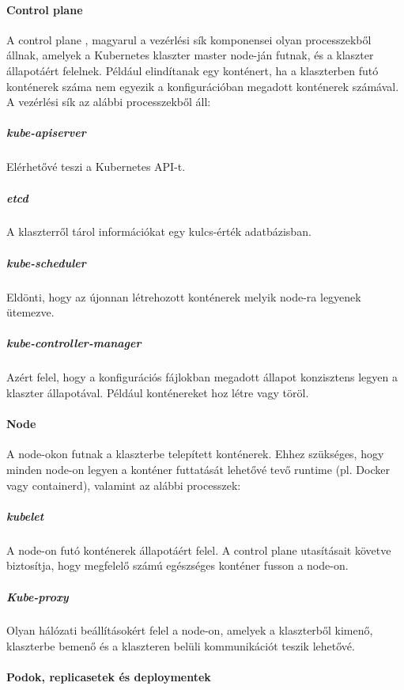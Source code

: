 \documentclass[a4paper,oneside]{article}
\begin{document}
\paragraph{Control plane}

A control plane \cite{kubernetes-cp-and-node}, magyarul a vezérlési sík
komponensei olyan processzekből állnak, amelyek a Kubernetes klaszter master
node-ján futnak, és a klaszter állapotáért felelnek. Például elindítanak egy
konténert, ha a klaszterben futó konténerek száma nem egyezik a konfigurációban
megadott konténerek számával. A vezérlési sík az alábbi processzekből áll:

\subparagraph{kube-apiserver}

Elérhetővé teszi a Kubernetes API-t.

\subparagraph{etcd}

A klaszterről tárol információkat egy kulcs-érték adatbázisban.

\subparagraph{kube-scheduler}

Eldönti, hogy az újonnan létrehozott konténerek melyik node-ra legyenek ütemezve.

\subparagraph{kube-controller-manager}

Azért felel, hogy a konfigurációs fájlokban megadott állapot konzisztens legyen
a klaszter állapotával. Például konténereket hoz létre vagy töröl.

\paragraph{Node}

A node-okon \cite{kubernetes-cp-and-node} futnak a klaszterbe telepített
konténerek. Ehhez szükséges, hogy minden node-on legyen a konténer futtatását
lehetővé tevő runtime (pl. Docker vagy containerd), valamint az alábbi
processzek:

\subparagraph{kubelet} A node-on futó konténerek állapotáért felel. A control
plane utasításait követve biztosítja, hogy megfelelő számú egészséges konténer
fusson a node-on.

\subparagraph{Kube-proxy} Olyan hálózati beállításokért felel a node-on, amelyek
a klaszterből kimenő, klaszterbe bemenő és a klaszteren belüli kommunikációt
teszik lehetővé.

\paragraph{Podok, replicasetek és deploymentek}
\end{document}
